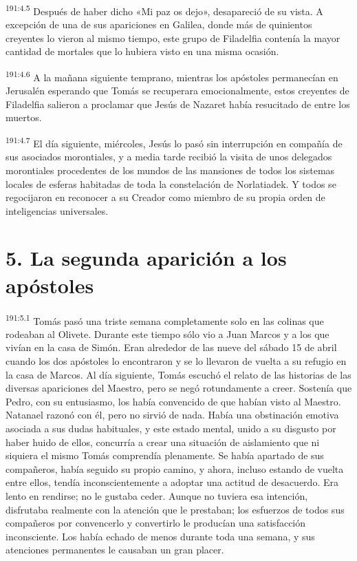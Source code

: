 \par
\textsuperscript{191:4.5} Después de haber dicho «Mi paz os dejo», desapareció de su vista. A excepción de una de sus apariciones en Galilea, donde más de quinientos creyentes lo vieron al mismo tiempo, este grupo de Filadelfia contenía la mayor cantidad de mortales que lo hubiera visto en una misma ocasión.

\par
\textsuperscript{191:4.6} A la mañana siguiente temprano, mientras los apóstoles permanecían en Jerusalén esperando que Tomás se recuperara emocionalmente, estos creyentes de Filadelfia salieron a proclamar que Jesús de Nazaret había resucitado de entre los muertos.

\par
\textsuperscript{191:4.7} El día siguiente, miércoles, Jesús lo pasó sin interrupción en compañía de sus asociados morontiales, y a media tarde recibió la visita de unos delegados morontiales procedentes de los mundos de las mansiones de todos los sistemas locales de esferas habitadas de toda la constelación de Norlatiadek. Y todos se regocijaron en reconocer a su Creador como miembro de su propia orden de inteligencias universales.

\section*{5. La segunda aparición a los apóstoles}
\par
\textsuperscript{191:5.1} Tomás pasó una triste semana completamente solo en las colinas que rodeaban al Olivete. Durante este tiempo sólo vio a Juan Marcos y a los que vivían en la casa de Simón. Eran alrededor de las nueve del sábado 15 de abril cuando los dos apóstoles lo encontraron y se lo llevaron de vuelta a su refugio en la casa de Marcos. Al día siguiente, Tomás escuchó el relato de las historias de las diversas apariciones del Maestro, pero se negó rotundamente a creer. Sostenía que Pedro, con su entusiasmo, los había convencido de que habían visto al Maestro. Natanael razonó con él, pero no sirvió de nada. Había una obstinación emotiva asociada a sus dudas habituales, y este estado mental, unido a su disgusto por haber huido de ellos, concurría a crear una situación de aislamiento que ni siquiera el mismo Tomás comprendía plenamente. Se había apartado de sus compañeros, había seguido su propio camino, y ahora, incluso estando de vuelta entre ellos, tendía inconscientemente a adoptar una actitud de desacuerdo. Era lento en rendirse; no le gustaba ceder. Aunque no tuviera esa intención, disfrutaba realmente con la atención que le prestaban; los esfuerzos de todos sus compañeros por convencerlo y convertirlo le producían una satisfacción inconsciente. Los había echado de menos durante toda una semana, y sus atenciones permanentes le causaban un gran placer.

